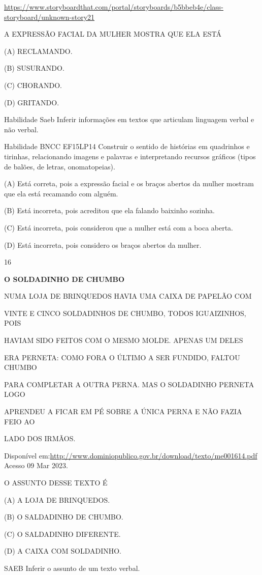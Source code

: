 {{{{{{\url{https://www.storyboardthat.com/portal/storyboards/b5bbeb4e/class-storyboard/unknown-story21}

A EXPRESSÃO FACIAL DA MULHER MOSTRA QUE ELA ESTÁ

(A) RECLAMANDO.

(B) SUSURANDO.

(C) CHORANDO.

(D) GRITANDO.

Habilidade Saeb Inferir informações em textos que articulam linguagem
verbal e não verbal.

Habilidade BNCC EF15LP14 Construir o sentido de histórias em quadrinhos
e tirinhas, relacionando imagens e palavras e interpretando recursos
gráficos (tipos de balões, de letras, onomatopeias).

(A) Está correta, pois a expressão facial e os braços abertos da mulher
mostram que ela está recamando com alguém.

(B) Está incorreta, pois acreditou que ela falando baixinho sozinha.

(C) Está incorreta, pois considerou que a mulher está com a boca aberta.

(D) Está incorreta, pois considero os braços abertos da mulher.

\num{16}

\textbf{O SOLDADINHO DE CHUMBO}

NUMA LOJA DE BRINQUEDOS HAVIA UMA CAIXA DE PAPELÃO COM

VINTE E CINCO SOLDADINHOS DE CHUMBO, TODOS IGUAIZINHOS, POIS

HAVIAM SIDO FEITOS COM O MESMO MOLDE. APENAS UM DELES

ERA PERNETA: COMO FORA O ÚLTIMO A SER FUNDIDO, FALTOU CHUMBO

PARA COMPLETAR A OUTRA PERNA. MAS O SOLDADINHO PERNETA LOGO

APRENDEU A FICAR EM PÉ SOBRE A ÚNICA PERNA E NÃO FAZIA FEIO AO

LADO DOS IRMÃOS.

Disponível
em:\url{http://www.dominiopublico.gov.br/download/texto/me001614.pdf}
Acesso 09 Mar 2023.

O ASSUNTO DESSE TEXTO É

(A) A LOJA DE BRINQUEDOS.

(B) O SALDADINHO DE CHUMBO.

(C) O SALDADINHO DIFERENTE.

(D) A CAIXA COM SOLDADINHO.

SAEB Inferir o assunto de um texto verbal.

}}}}}}
